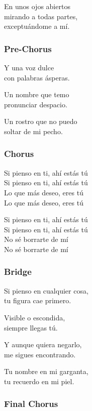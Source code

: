 \documentclass[]{article}
\begin{document}
En unos ojos abiertos\\
mirando a todas partes,\\
exceptuándome a mí.

\subsubsection{Pre-Chorus}\label{pre-chorus-31}

Y una voz dulce\\
con palabras ásperas.

Un nombre que temo\\
pronunciar despacio.

Un rostro que no puedo\\
soltar de mi pecho.

\subsubsection{Chorus}\label{chorus-48}

Si pienso en ti, ahí estás tú\\
Si pienso en ti, ahí estás tú\\
Lo que más deseo, eres tú\\
Lo que más deseo, eres tú

Si pienso en ti, ahí estás tú\\
Si pienso en ti, ahí estás tú\\
No sé borrarte de mí\\
No sé borrarte de mí

\subsubsection{Bridge}\label{bridge-13}

Si pienso en cualquier cosa,\\
tu figura cae primero.

Visible o escondida,\\
siempre llegas tú.

Y aunque quiera negarlo,\\
me sigues encontrando.

Tu nombre en mi garganta,\\
tu recuerdo en mi piel.

\subsubsection{Final Chorus}\label{final-chorus-4}
\end{document}
